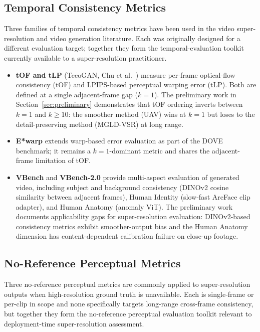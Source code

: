 \subsection{Temporal Consistency Metrics}

Three families of temporal consistency metrics have been used in the video super-resolution
and video generation literature. Each was originally designed for a different evaluation
target; together they form the temporal-evaluation toolkit currently available to a
super-resolution practitioner.

\begin{itemize}
    \item \textbf{tOF and tLP} (TecoGAN, Chu et al.\ \cite{chu_tecogan_2020}) measure
          per-frame optical-flow consistency (tOF) and LPIPS-based perceptual warping error
          (tLP). Both are defined at a single adjacent-frame gap ($k{=}1$). The preliminary
          work in Section~\ref{sec:preliminary} demonstrates that tOF ordering inverts
          between $k{=}1$ and $k{\geq}10$: the smoother method (UAV) wins at $k{=}1$ but
          loses to the detail-preserving method (MGLD-VSR) at long range.
    \item \textbf{E*warp} \cite{yang_dove_2024} extends warp-based error evaluation as part
          of the DOVE benchmark; it remains a $k{=}1$-dominant metric and shares the
          adjacent-frame limitation of tOF.
    \item \textbf{VBench} \cite{huang_vbench_2024} and \textbf{VBench-2.0}
          \cite{huang_vbench2_2025} provide multi-aspect evaluation of generated video,
          including subject and background consistency (DINOv2 cosine similarity between
          adjacent frames), Human Identity (slow-fast ArcFace clip adapter), and Human
          Anatomy (anomaly ViT). The preliminary work documents applicability gaps for
          super-resolution evaluation: DINOv2-based consistency metrics exhibit
          smoother-output bias and the Human Anatomy dimension has content-dependent
          calibration failure on close-up footage.
\end{itemize}

\subsection{No-Reference Perceptual Metrics}

Three no-reference perceptual metrics are commonly applied to super-resolution outputs when
high-resolution ground truth is unavailable. Each is single-frame or per-clip in scope and
none specifically targets long-range cross-frame consistency, but together they form the
no-reference perceptual evaluation toolkit relevant to deployment-time super-resolution
assessment.

